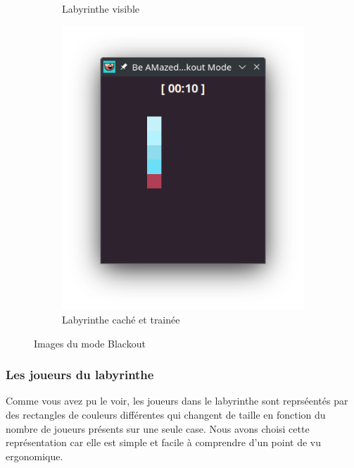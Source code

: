 \begin{figure}[!htb]
\begin{subfigure}[b]{0.3\textwidth}
        \caption{Labyrinthe visible}
    \end{subfigure}
    \hfill
    \begin{subfigure}[b]{0.3\textwidth}
        \includegraphics[width=\textwidth]{ressources/Implementation/Labyrinthe/Vue/Blackout/BlackoutDarkParticles.png}
        \caption{Labyrinthe caché et trainée}
    \end{subfigure}

    \caption{Images du mode Blackout}
\end{figure}

\subsubsection*{Les joueurs du labyrinthe}

Comme vous avez pu le voir, les joueurs dans le labyrinthe sont reprséentés par des rectangles de couleurs différentes qui changent de taille en fonction du nombre de joueurs présents sur une seule case. Nous avons choisi cette représentation car elle est simple et facile à comprendre d'un point de vu ergonomique.

